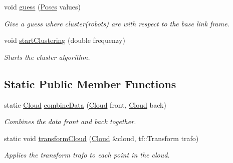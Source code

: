 \begin{DoxyCompactItemize}
void \hyperlink{classLaserPredictor_aa43afd04407b1a92d1ea722cc8d6d4bc}{guess} (\hyperlink{classLaserPredictor_a6c7dc6bd4bfb6acd3d95e88e1b9b4be2}{Poses} values)
\begin{DoxyCompactList}\small\item\em Give a guess where cluster(robots) are with respect to the base link frame. \end{DoxyCompactList}\item 
void \hyperlink{classLaserPredictor_a5e9c2c66bd54512e480bbc1c88d2c13d}{start\+Clustering} (double frequenzy)
\begin{DoxyCompactList}\small\item\em Starts the cluster algorithm. \end{DoxyCompactList}\end{DoxyCompactItemize}
\subsection*{Static Public Member Functions}
\begin{DoxyCompactItemize}
\item 
static \hyperlink{classLaserPredictor_ae6d64da5bf82f544a2ea8a421af5a677}{Cloud} \hyperlink{classLaserPredictor_a10a142e38f04a4459aa6d6783c87f1cd}{combine\+Data} (\hyperlink{classLaserPredictor_ae6d64da5bf82f544a2ea8a421af5a677}{Cloud} front, \hyperlink{classLaserPredictor_ae6d64da5bf82f544a2ea8a421af5a677}{Cloud} back)
\begin{DoxyCompactList}\small\item\em Combines the data front and back together. \end{DoxyCompactList}\item 
static void \hyperlink{classLaserPredictor_a06751e2996c1021bb8f4e4952b6286a4}{transform\+Cloud} (\hyperlink{classLaserPredictor_ae6d64da5bf82f544a2ea8a421af5a677}{Cloud} \&cloud, tf\+::\+Transform trafo)
\begin{DoxyCompactList}\small\item\em Applies the transform trafo to each point in the cloud. \end{DoxyCompactList}\end{DoxyCompactItemize}
